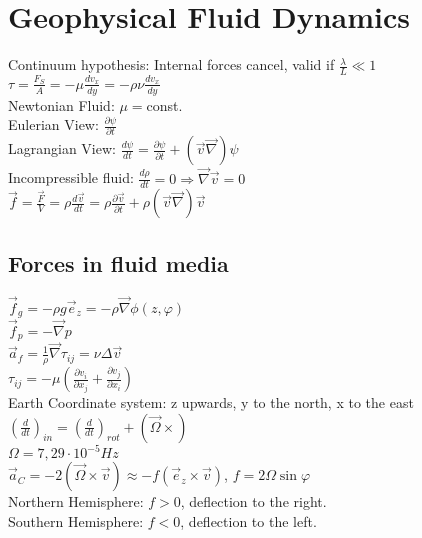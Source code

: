 \section*{Geophysical Fluid Dynamics}
Continuum hypothesis: Internal forces cancel, valid if $\frac{\lambda}{L}\ll 1$\\
$\tau=\frac{F_S}{A}=-\mu\frac{dv_x}{dy}=-\rho\nu\frac{dv_x}{dy}$\\
Newtonian Fluid: $\mu=$const.\\
Eulerian View: $\frac{\partial\psi}{\partial t}$\\
Lagrangian View: $\frac{d\psi}{dt}=\frac{\partial\psi}{\partial t} + (\vec{v}\vec{\nabla})\psi$\\
Incompressible fluid: $\frac{d\rho}{dt}=0 \Rightarrow \vec{\nabla}\vec{v}=0$\\
$\vec{f}=\frac{\vec{F}}{V}=\rho \frac{d\vec{v}}{dt}=\rho\frac{\partial\vec{v}}{\partial t}+\rho(\vec{v}\vec{\nabla})\vec{v}$
\subsection*{Forces in fluid media}
$\vec{f}_g=-\rho g \vec{e}_z = -\rho\vec{\nabla}\phi(z,\varphi)$\\
$\vec{f}_p=-\vec{\nabla}p$\\
$\vec{a}_f=\frac{1}{\rho}\vec{\nabla}\tau_{ij}=\nu\Delta \vec{v}$\\
$\tau_{ij}=-\mu\left(\frac{\partial v_i}{\partial x_j}+\frac{\partial v_j}{\partial x_i}\right)$\\
Earth Coordinate system: z upwards, y to the north, x to the east\\
$\left(\frac{d}{dt}\right)_{in}=\left(\frac{d}{dt}\right)_{rot}+(\vec{\Omega}\times)$\\
$\Omega=7,29\cdot10^{-5}Hz$\\
$\vec{a}_C=-2(\vec{\Omega}\times\vec{v})\approx -f(\vec{e}_z\times\vec{v})$, $f=2\Omega\sin{\varphi}$\\
Northern Hemisphere: $f>0$, deflection to the right.\\
Southern Hemisphere: $f<0$, deflection to the left.\\
